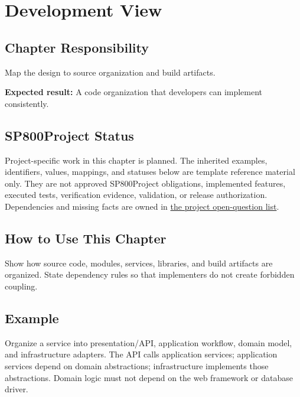 \chapter{Development View}
\section{Chapter Responsibility}
\label{Section:DevelopmentViewResponsibility}
Map the design to source organization and build artifacts.

\noindent\textbf{Expected result:} A code organization that developers can implement consistently.

\section{SP800Project Status}
\label{Section:SP800StatusDevelopmentView}
Project-specific work in this chapter is planned. The inherited examples,
identifiers, values, mappings, and statuses below are template reference
material only. They are not approved SP800Project obligations, implemented features,
executed tests, verification evidence, validation, or release authorization.
Dependencies and missing facts are owned in
\hyperref[Section:SP800OpenQuestions]{the project open-question list}.

\section{How to Use This Chapter}
Show how source code, modules, services, libraries, and build artifacts are organized. State dependency rules so that implementers do not create forbidden coupling.
\section{Example}
Organize a service into presentation/API, application workflow, domain model, and infrastructure adapters. The API calls application services; application services depend on domain abstractions; infrastructure implements those abstractions. Domain logic must not depend on the web framework or database driver.

